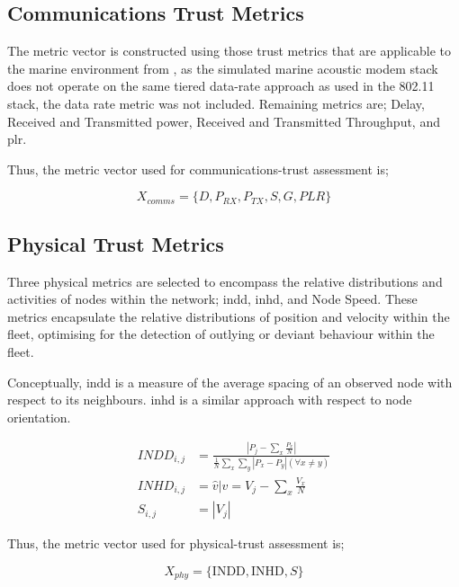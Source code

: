 \subsection{Communications Trust Metrics}

The metric vector is constructed using those trust metrics that are applicable to the marine environment from \cite{Guo2012}, as the simulated marine acoustic modem stack does not operate on the same tiered data-rate approach as used in the 802.11 stack, the data rate metric was not included. Remaining metrics are; Delay, Received and Transmitted power, Received and Transmitted Throughput, and \gls{plr}.

Thus, the metric vector used for communications-trust assessment is;

\begin{equation}
	X_{comms}=\{D, P_{RX}, P_{TX}, S, G, PLR\}
	\label{eq:comms_vector}
\end{equation}

\subsection{Physical Trust Metrics}

Three physical metrics are selected to encompass the relative distributions and activities of nodes within the network; \gls{indd}, \gls{inhd}, and Node Speed. These metrics encapsulate the relative distributions of position and velocity within the fleet, optimising for the detection of outlying or deviant behaviour within the fleet.

Conceptually, \gls{indd} is a measure of the average spacing of an observed node with respect to its neighbours. \gls{inhd} is a similar approach with respect to node orientation.

\begin{align}
	INDD_{i,j} &= \frac{|P_j - \sum_x \frac{P_x}{N}|}{\frac{1}{N}\sum_x \sum_y{|P_x - P_y| (\forall x \neq y)}}\\
	INHD_{i,j} &= \hat{v} \vert v= V_j - \sum_x{\frac{V_x}{N}}\\
	S_{i,j} &= |V_j|
\end{align}

Thus, the metric vector used for physical-trust assessment is;

\begin{equation}
  X_{phy}=\{\text{INDD}, \text{INHD}, S\}
	\label{eq:phys:vector}
\end{equation}

